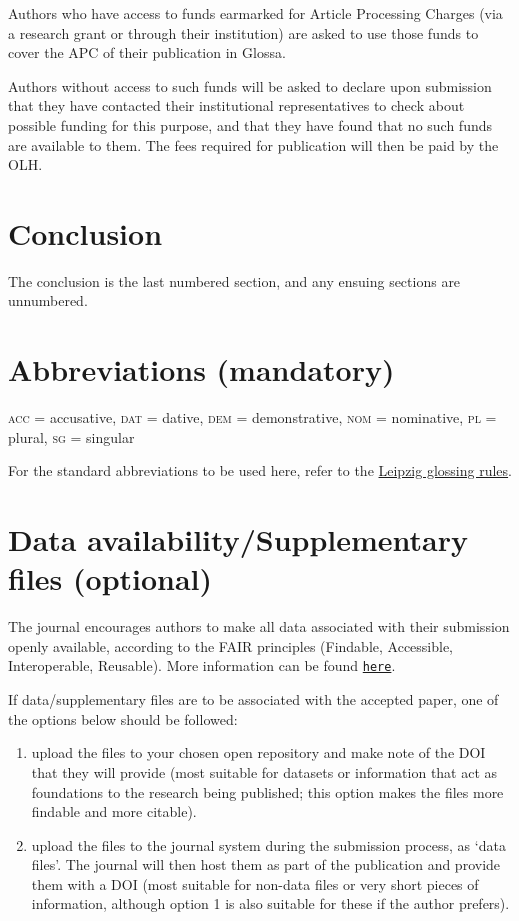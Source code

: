 \documentclass[charis,linguex]{glossa}
\begin{document}
Authors who have access to funds earmarked for Article Processing Charges (via a research grant or through their institution) are asked to use those funds to cover the APC of their publication in Glossa. 

Authors without access to such funds will be asked to declare upon submission that they have contacted their institutional representatives to check about possible funding for this purpose, and that they have found that no such funds are available to them. The fees required for publication will then be paid by the OLH. %

\section{Conclusion}

The conclusion is the last numbered section, and any ensuing sections are unnumbered.

\section*{Abbreviations (mandatory)}\label{abbrev}

\textsc{acc} = accusative, \textsc{dat} = dative, \textsc{dem} = demonstrative, \textsc{nom} = nominative, \textsc{pl} = plural, \textsc{sg} = singular

For the standard abbreviations to be used here, refer to the \href{https://www.eva.mpg.de/lingua/resources/glossing-rules.php}{Leipzig glossing rules}. 

\section*{Data availability/Supplementary files (optional)}

The journal encourages authors to make all data associated with their submission openly available, according to the FAIR principles (Findable, Accessible, Interoperable, Reusable). More information can be found \href{https://www.glossa-journal.org/about/editorialpolicies/#data-policy}{\texttt{here}}.

If data/supplementary files are to be associated with the accepted paper, one of the options below should be followed:
\begin{enumerate}
\item upload the files to your chosen open repository and make note of the DOI that they will provide (most suitable for datasets or information that act as foundations to the research being published; this option makes the files more findable and more citable).
\item upload the files to the journal system during the submission process, as `data files'. The journal will then host them as part of the publication and provide them with a DOI (most suitable for non-data files or very short pieces of information, although option 1 is also suitable for these if the author prefers).
\end{enumerate}
\end{document}
